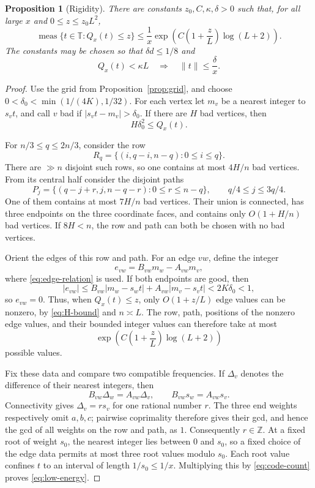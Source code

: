 \documentclass[10pt,reqno]{amsart}
\newtheorem{proposition}[theorem]{Proposition}
\newcommand{\Z}{\mathbb Z}
\newcommand{\T}{\mathbb T}
\newcommand{\distz}[1]{\lVert #1\rVert}
\begin{document}
\begin{proposition}[Rigidity]\label{prop:rigidity}
There are constants $z_0,C,\kappa,\delta>0$ such that, for all large $x$ and
$0\le z\le z_0L^2$,
\begin{equation}\label{eq:low-energy}
 \operatorname{meas}\{t\in\T:Q_x(t)\le z\}
 \le \frac1x
 \exp\!\left(C\left(1+\frac zL\right)\log(L+2)\right).
\end{equation}
The constants may be chosen so that $\delta d\le1/8$ and
\begin{equation}\label{eq:very-low}
 Q_x(t)<\kappa L\quad\Longrightarrow\quad
 \distz t\le\frac\delta x.
\end{equation}
\end{proposition}

\begin{proof}
Use the grid from Proposition~\ref{prop:grid}, and choose
$0<\delta_0<\min(1/(4K),1/32)$.  For each vertex let $m_v$ be a nearest integer to
$s_vt$, and call $v$ bad if $|s_vt-m_v|>\delta_0$.  If there are $H$ bad
vertices, then
\begin{equation}\label{eq:H-bound}
 H\delta_0^2\le Q_x(t).
\end{equation}

For $n/3\le q\le2n/3$, consider the row
\[
 R_q=\{(i,q-i,n-q):0\le i\le q\}.
\]
There are $\gg n$ disjoint such rows, so one contains at most $4H/n$ bad
vertices.  From its central half consider the disjoint paths
\[
 P_j=\{(q-j+r,j,n-q-r):0\le r\le n-q\},
 \qquad q/4\le j\le3q/4.
\]
One of them contains at most $7H/n$ bad vertices.  Their union is connected,
has three endpoints on the three coordinate faces, and contains only
$O(1+H/n)$ bad vertices.  If $8H<n$, the row and path can both be chosen with
no bad vertices.

Orient the edges of this row and path.  For an edge $vw$, define the integer
\[
 e_{vw}=B_{vw}m_w-A_{vw}m_v,
\]
where \eqref{eq:edge-relation} is used.  If both endpoints are good, then
\[
 |e_{vw}|\le B_{vw}|m_w-s_wt|+A_{vw}|m_v-s_vt|<2K\delta_0<1,
\]
so $e_{vw}=0$.  Thus, when $Q_x(t)\le z$, only
$O(1+z/L)$ edge values can be nonzero, by \eqref{eq:H-bound} and $n\asymp L$.
The row, path, positions of the nonzero edge values, and their bounded integer
values can therefore take at most
\begin{equation}\label{eq:code-count}
 \exp\!\left(C\left(1+\frac zL\right)\log(L+2)\right)
\end{equation}
possible values.

Fix these data and compare two compatible frequencies.  If
$\Delta_v$ denotes the difference of their nearest integers, then
\[
 B_{vw}\Delta_w=A_{vw}\Delta_v,
 \qquad B_{vw}s_w=A_{vw}s_v.
\]
Connectivity gives $\Delta_v=r s_v$ for one rational number $r$.  The three
end weights respectively omit $a,b,c$; pairwise coprimality therefore gives
their gcd, and hence the gcd of all weights on the row and path, as $1$.
Consequently $r\in\Z$.  At a fixed root of weight $s_0$, the nearest integer
lies between $0$ and $s_0$, so a fixed choice of the edge data permits at most
three root values modulo $s_0$.  Each root value confines $t$ to an interval of
length $1/s_0\le1/x$.  Multiplying this by \eqref{eq:code-count} proves
\eqref{eq:low-energy}.


\end{proof}
\end{document}
